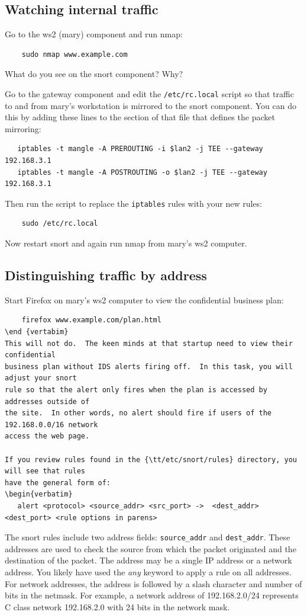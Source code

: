 {\subsection{Watching internal traffic}
Go to the ws2 (mary) component and run nmap:
\begin{verbatim}
    sudo nmap www.example.com
\end{verbatim}
What do you see on the snort component?  Why?

Go to the gateway component and edit the {\tt /etc/rc.local} script so that traffic to and
from mary's workstation is mirrored to the snort component.  You can do this by adding
these lines to the section of that file that defines the packet mirroring:
\begin{verbatim}
   iptables -t mangle -A PREROUTING -i $lan2 -j TEE --gateway 192.168.3.1
   iptables -t mangle -A POSTROUTING -o $lan2 -j TEE --gateway 192.168.3.1
\end{verbatim}

Then run the script to replace the {\tt iptables} rules with your new rules:
\begin{verbatim}
    sudo /etc/rc.local
\end{verbatim}
Now restart snort and again run nmap from mary's ws2 computer.


\subsection{Distinguishing traffic by address}
Start Firefox on mary's ws2 computer to view the confidential business plan:
\begin {verbatim}
    firefox www.example.com/plan.html
\end {vertabim}
This will not do.  The keen minds at that startup need to view their confidential
business plan without IDS alerts firing off.  In this task, you will adjust your snort
rule so that the alert only fires when the plan is accessed by addresses outside of
the site.  In other words, no alert should fire if users of the 192.168.0.0/16 network
access the web page.

If you review rules found in the {\tt/etc/snort/rules} directory, you will see that rules
have the general form of:
\begin{verbatim}
   alert <protocol> <source_addr> <src_port> ->  <dest_addr> <dest_port> <rule options in parens>
\end{verbatim}

The snort rules include two address fields: {\tt source\_addr} and {\tt dest\_addr}. 
These addresses are used to check the
source from which the packet originated and the destination of the packet. The address
may be a single IP address or a network address. You likely have used the \textit{any} keyword to apply a
rule on all addresses. For network addresses, the address is followed by a slash character 
and number of bits in the netmask. For example, a network address of 192.168.2.0/24 
represents C class network 192.168.2.0 with 24 bits in the network mask.

}

